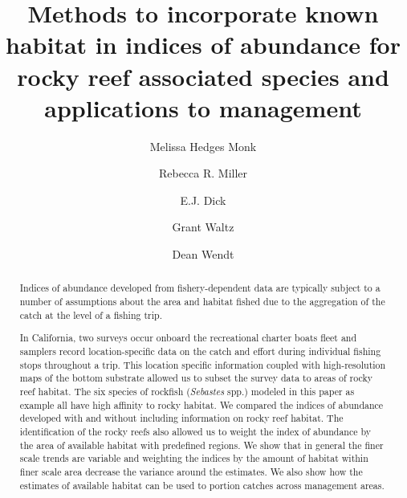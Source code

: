 \documentclass[
  12pt,
  authoryear,
  preprint,
  3p]{elsarticle}
\begin{document}
\begin{frontmatter}
\title{Methods to incorporate known habitat in indices of abundance for
rocky reef associated species and applications to management}
\author[1]{Melissa Hedges Monk%
%
}
\author[2]{Rebecca R. Miller%
%
}
\author[1]{E.J. Dick%
%
}
\author[33]{Grant Waltz%
%
}
\author[3]{Dean Wendt%
%
}









        
\begin{abstract}
Indices of abundance developed from fishery-dependent data are typically
subject to a number of assumptions about the area and habitat fished due
to the aggregation of the catch at the level of a fishing trip.

In California, two surveys occur onboard the recreational charter boats
fleet and samplers record location-specific data on the catch and effort
during individual fishing stops throughout a trip. This location
specific information coupled with high-resolution maps of the bottom
substrate allowed us to subset the survey data to areas of rocky reef
habitat. The six species of rockfish (\emph{Sebastes} spp.) modeled in
this paper as example all have high affinity to rocky habitat. We
compared the indices of abundance developed with and without including
information on rocky reef habitat. The identification of the rocky reefs
also allowed us to weight the index of abundance by the area of
available habitat with predefined regions. We show that in general the
finer scale trends are variable and weighting the indices by the amount
of habitat within finer scale area decrease the variance around the
estimates. We also show how the estimates of available habitat can be
used to portion catches across management areas.
\end{abstract}






\end{frontmatter}
\end{document}
